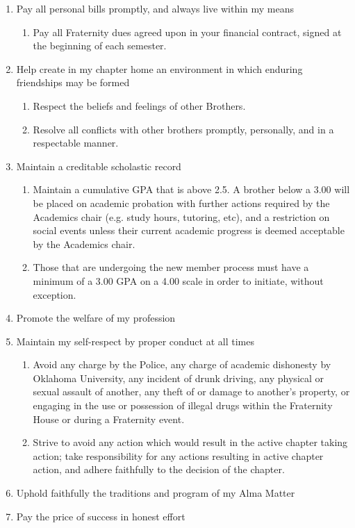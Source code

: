 \documentclass{article}
\begin{document}
\begin{enumerate}
    \item Pay all personal bills promptly, and always live within my means
    \begin{enumerate}
        \item Pay all Fraternity dues agreed upon in your financial contract, signed at the beginning of each semester.
    \end{enumerate}
    \item Help create in my chapter home an environment in which enduring friendships may be formed
    \begin{enumerate}
        \item Respect the beliefs and feelings of other Brothers.
        \item Resolve all conflicts with other brothers promptly, personally, and in a respectable manner.
    \end{enumerate}
    \item Maintain a creditable scholastic record
    \begin{enumerate}
        \item Maintain a cumulative GPA that is above 2.5. A brother below a 3.00 will be placed on academic probation with further actions required by the Academics chair (e.g. study hours, tutoring, etc), and a restriction on social events unless their current academic progress is deemed acceptable by the Academics chair.
        \item Those that are undergoing the new member process must have a minimum of a 3.00 GPA on a 4.00 scale in order to initiate, without exception.
    \end{enumerate}
    \item Promote the welfare of my profession
    \item Maintain my self-respect by proper conduct at all times
    \begin{enumerate}
        \item Avoid any charge by the Police, any charge of academic dishonesty by Oklahoma University, any incident of drunk driving, any physical or sexual assault of another, any theft of or damage to another’s property, or engaging in the use or possession of illegal drugs within the Fraternity House or during a Fraternity event.
        \item Strive to avoid any action which would result in the active chapter taking action; take responsibility for any actions resulting in active chapter action, and adhere faithfully to the decision of the chapter.
    \end{enumerate}
    \item Uphold faithfully the traditions and program of my Alma Matter
    \item Pay the price of success in honest effort
\end{enumerate}
\end{document}
